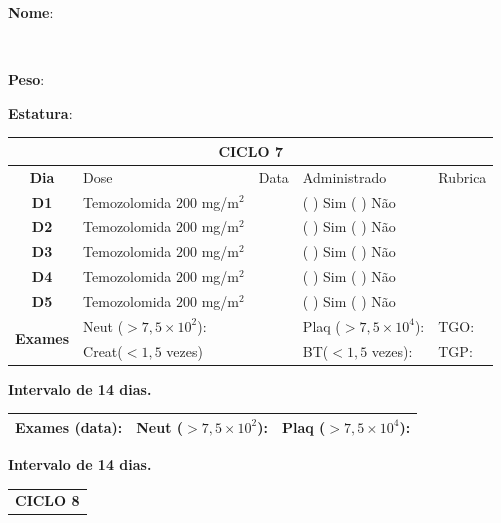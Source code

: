\documentclass[11pt,a4paper,oldfontcommands]{memoir}
\def\entrywithlabel[#1]#2{\parbox{#1}{{\small #2:} \hrulefill}}
\begin{document}
\begin{center}
\pagebreak
    \noindent
\entrywithlabel[1\hsize]{\textbf{Nome}}\hfill
\\[0.3cm]
\entrywithlabel[.45\hsize]{\textbf{Peso}}\hfill  \entrywithlabel[.45\hsize]{\textbf{Estatura}}

\begin{table}[H]
\begin{tabular}{p{1cm}p{5cm}|p{1cm}|p{4.5cm}|p{2cm}}
	\hline
	\multicolumn{5}{c}{\textbf{CICLO 7}}\\
\hline
    \multicolumn{1}{c|}{\multirow{1}{*}{\textbf{Dia}}}&{Dose}&{Data}&{Administrado}&{Rubrica} \\
    \hline
    \multicolumn{1}{c|}{\multirow{1}{*}{\textbf{D1}}}&{Temozolomida \(200\) mg/m\(^2\)}&&{(  ) Sim (  ) Não}&\\
    \multicolumn{1}{c|}{\multirow{1}{*}{\textbf{D2}}}&{Temozolomida \(200\) mg/m\(^2\)}&&{(  ) Sim (  ) Não}&\\
    \multicolumn{1}{c|}{\multirow{1}{*}{\textbf{D3}}}&{Temozolomida \(200\) mg/m\(^2\)}&&{(  ) Sim (  ) Não}&\\
    \multicolumn{1}{c|}{\multirow{1}{*}{\textbf{D4}}}&{Temozolomida \(200\) mg/m\(^2\)}&&{(  ) Sim (  ) Não}&\\
    \multicolumn{1}{c|}{\multirow{1}{*}{\textbf{D5}}}&{Temozolomida \(200\) mg/m\(^2\)}&&{(  ) Sim (  ) Não}&\\
    \hline
    \multicolumn{1}{c|}{\multirow{2}{*}{\textbf{Exames}}}&\multicolumn{2}{l|}{Neut (\(>7,5\times10^2\)):}&{Plaq (\(>7,5\times10^4\)):}&{TGO:}\\
    \cline{2-5}
    \multicolumn{1}{c|}{\multirow{2}{*}{{}}}&\multicolumn{2}{l|}{Creat(\(<1,5\) vezes)}&{BT(\(<1,5\) vezes):}&{TGP:}
    \\
    \hline
\end{tabular}
\end{table}
\textbf{Intervalo de 14 dias.}
\begin{table}[H]
\begin{tabular}{p{5cm}|p{5cm}|p{4.7cm}}
    \hline
    \textbf{Exames (data):}&{Neut (\(>7,5\times10^2\)):}&{Plaq (\(>7,5\times10^4\)):}
    \\
    \hline
\end{tabular}
\end{table}
\textbf{Intervalo de 14 dias.}
\begin{table}[H]
\begin{tabular}{p{1cm}p{5cm}|p{1cm}|p{4.5cm}|p{2cm}}
	\hline
	\multicolumn{5}{c}{\textbf{CICLO 8}}\\

\end{tabular}
\end{table}
\end{center}
\end{document}
